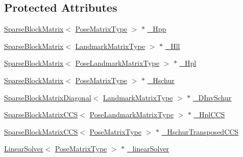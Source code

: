 \subsection*{Protected Attributes}
\begin{DoxyCompactItemize}
\item 
\hyperlink{classg2o_1_1SparseBlockMatrix}{Sparse\+Block\+Matrix}$<$ \hyperlink{classg2o_1_1BlockSolver_a8c7c43d361bd31e3e0353889ba703bc0}{Pose\+Matrix\+Type} $>$ $\ast$ \hyperlink{classg2o_1_1BlockSolver_ac222d4342825ed8632a87b4f5be94618}{\+\_\+\+Hpp}
\item 
\hyperlink{classg2o_1_1SparseBlockMatrix}{Sparse\+Block\+Matrix}$<$ \hyperlink{classg2o_1_1BlockSolver_afd898a666343291129d37a979e23ded6}{Landmark\+Matrix\+Type} $>$ $\ast$ \hyperlink{classg2o_1_1BlockSolver_a88d4c24df24a8fb72be1a4e4cff03d71}{\+\_\+\+Hll}
\item 
\hyperlink{classg2o_1_1SparseBlockMatrix}{Sparse\+Block\+Matrix}$<$ \hyperlink{classg2o_1_1BlockSolver_a96bf60b923f816086cd2f24de38736ec}{Pose\+Landmark\+Matrix\+Type} $>$ $\ast$ \hyperlink{classg2o_1_1BlockSolver_a0f6051339990e95aa587145a8a6f4f5f}{\+\_\+\+Hpl}
\item 
\hyperlink{classg2o_1_1SparseBlockMatrix}{Sparse\+Block\+Matrix}$<$ \hyperlink{classg2o_1_1BlockSolver_a8c7c43d361bd31e3e0353889ba703bc0}{Pose\+Matrix\+Type} $>$ $\ast$ \hyperlink{classg2o_1_1BlockSolver_a46977934a3e4fb0cd36bc4181ed3ec0e}{\+\_\+\+Hschur}
\item 
\hyperlink{classg2o_1_1SparseBlockMatrixDiagonal}{Sparse\+Block\+Matrix\+Diagonal}$<$ \hyperlink{classg2o_1_1BlockSolver_afd898a666343291129d37a979e23ded6}{Landmark\+Matrix\+Type} $>$ $\ast$ \hyperlink{classg2o_1_1BlockSolver_ad6a1a8f17c8fb854962a8204c79bc981}{\+\_\+\+D\+Inv\+Schur}
\item 
\hyperlink{classg2o_1_1SparseBlockMatrixCCS}{Sparse\+Block\+Matrix\+C\+CS}$<$ \hyperlink{classg2o_1_1BlockSolver_a96bf60b923f816086cd2f24de38736ec}{Pose\+Landmark\+Matrix\+Type} $>$ $\ast$ \hyperlink{classg2o_1_1BlockSolver_ab54eb7bb13f8b3a8a5f135a98f2050ec}{\+\_\+\+Hpl\+C\+CS}
\item 
\hyperlink{classg2o_1_1SparseBlockMatrixCCS}{Sparse\+Block\+Matrix\+C\+CS}$<$ \hyperlink{classg2o_1_1BlockSolver_a8c7c43d361bd31e3e0353889ba703bc0}{Pose\+Matrix\+Type} $>$ $\ast$ \hyperlink{classg2o_1_1BlockSolver_acea4b8ea8db5a29b63bea4bc568b0b26}{\+\_\+\+Hschur\+Transposed\+C\+CS}
\item 
\hyperlink{classg2o_1_1LinearSolver}{Linear\+Solver}$<$ \hyperlink{classg2o_1_1BlockSolver_a8c7c43d361bd31e3e0353889ba703bc0}{Pose\+Matrix\+Type} $>$ $\ast$ \hyperlink{classg2o_1_1BlockSolver_a676a4ef473ccaecb23050284e19659af}{\+\_\+linear\+Solver}

\end{DoxyCompactItemize}
